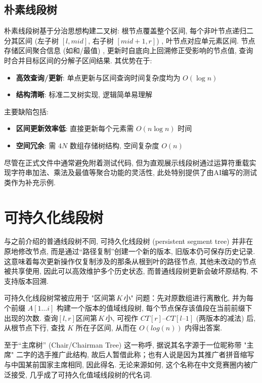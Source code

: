 \documentclass[a4paper]{ctexbook}
\begin{document}
\subsection*{朴素线段树}

朴素线段树基于分治思想构建二叉树: 根节点覆盖整个区间, 每个非叶节点递归二分其区间 (左子树 $[l, mid]$, 右子树 $[mid+1, r]$) , 叶节点对应单元素区间. 节点存储区间聚合信息 (如和/最值) , 更新时自底向上回溯修正受影响的节点值, 查询时合并目标区间的分解子区间结果. 其优势在于:
\begin{itemize}
	\item \textbf{高效查询/更新}: 单点更新与区间查询时间复杂度均为 $O(\log n)$
	\item \textbf{结构清晰}: 标准二叉树实现, 逻辑简单易理解
\end{itemize}
主要缺陷包括:
\begin{itemize}
	\item \textbf{区间更新效率低}: 直接更新每个元素需 $O(n \log n)$ 时间
	\item \textbf{空间冗余}: 需 $4N$ 数组存储树结构, 空间复杂度 $O(n)$
\end{itemize}

尽管在正式文件中通常避免附着测试代码, 但为直观展示线段树通过运算符重载实现字符串加法、乘法及最值等聚合功能的灵活性, 此处特别提供了由AI编写的测试类作为补充示例.



\section*{可持久化线段树}

与之前介绍的普通线段树不同, 可持久化线段树 (persistent segment tree) 并非在原地修改节点, 而是通过“路径复制”创建一个新的版本, 旧版本仍可保存历史记录. 这意味着每次更新操作仅复制涉及的那条从根到叶的路径节点, 其他未改动的节点被共享使用, 因此可以高效维护多个历史状态, 而普通线段树更新会破坏原结构, 不支持版本回溯.

可持久化线段树常被应用于 "区间第 $K$ 小" 问题：先对原数组进行离散化, 并为每个前缀 $A[1\dots i]$ 构建一个版本的值域线段树, 每个节点保存该值段在当前前缀下出现的次数. 查询$[l,r]$区间第 $K$ 小, 可视作 $CT[r]–CT[l–1]$ (两版本的减法) 后, 从根节点下行, 查找 $K$ 所在子区间, 从而在 $O(log(n))$ 内得出答案.

至于“主席树” (Chair/Chairman Tree) 这一称呼, 据说其名字源于一位昵称带 "主席" 二字的选手推广此结构, 故后人暂借此称；也有人说是因为其推广者拼音缩写与中国某前国家主席相同, 因此得名. 无论来源如何, 这个名称在中文竞赛圈内被广泛接受, 几乎成了可持久化值域线段树的代名词.
\end{document}
